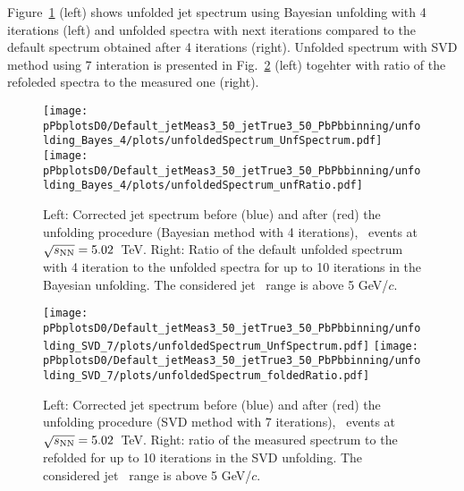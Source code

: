 
Figure~\ref{fig:PbPb_UnfSpec_pPb_Dzero_reg4} (left) shows unfolded jet \pt spectrum using Bayesian unfolding with 4 iterations (left) and unfolded spectra with next iterations compared to the default spectrum obtained after 4 iterations (right).
Unfolded spectrum with SVD method using 7 interation is presented in Fig.~\ref{fig:PbPb_UnfSpec_pPb_Dzero_SVD} (left) togehter with ratio of the refoleded spectra to the measured one (right).

\begin{figure}[bth]
\centering
\texttt{[image: pPbplotsD0/Default\_jetMeas3\_50\_jetTrue3\_50\_PbPbbinning/unfolding\_Bayes\_4/plots/unfoldedSpectrum\_UnfSpectrum.pdf]}
\texttt{[image: pPbplotsD0/Default\_jetMeas3\_50\_jetTrue3\_50\_PbPbbinning/unfolding\_Bayes\_4/plots/unfoldedSpectrum\_unfRatio.pdf]}
\caption{Left: Corrected jet \pt spectrum before (blue) and after (red) the unfolding procedure (Bayesian method with 4 iterations), \pPb\ events at $\sqrt{s_{\rm NN}}=5.02$~TeV. Right: Ratio of the default unfolded spectrum with 4 iteration to the unfolded spectra for up to 10 iterations in the Bayesian unfolding. The considered jet \pt\ range is above 5 GeV/$c$.}
\label{fig:PbPb_UnfSpec_pPb_Dzero_reg4}
\end{figure}

\begin{figure}[bth]
\centering
\texttt{[image: pPbplotsD0/Default\_jetMeas3\_50\_jetTrue3\_50\_PbPbbinning/unfolding\_SVD\_7/plots/unfoldedSpectrum\_UnfSpectrum.pdf]}
\texttt{[image: pPbplotsD0/Default\_jetMeas3\_50\_jetTrue3\_50\_PbPbbinning/unfolding\_SVD\_7/plots/unfoldedSpectrum\_foldedRatio.pdf]}
\caption{Left: Corrected jet \pt spectrum before (blue) and after (red) the unfolding procedure (SVD method with 7 iterations), \pPb\ events at $\sqrt{s_{\rm NN}}=5.02$~TeV. Right: ratio of the measured spectrum to the refolded for up to 10 iterations in the SVD unfolding. The considered jet \pt\ range is above 5 GeV/$c$.}
\label{fig:PbPb_UnfSpec_pPb_Dzero_SVD}
\end{figure}



